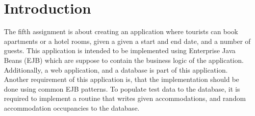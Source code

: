 \section{Introduction}\label{sec:01_intro}
The fifth assignment is about creating an application where tourists can book apartments or a hotel rooms, given a given a start and end date, and a number of guests.
This application is intended to be implemented using Enterprise Java Beans (EJB) which are suppose to contain the business logic of the application. Additionally, a web application, and a database is part of this application.
Another requirement of this application is, that the implementation should be done using common EJB patterns.
To populate test data to the database, it is required to implement a routine that writes given accommodations, and random accommodation occupancies to the database.
